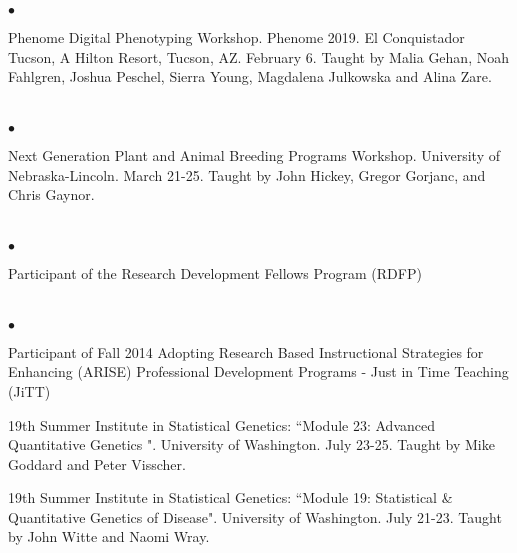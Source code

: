 \documentclass[margin,line,10pt]{res}
\newenvironment{list2}{
  \begin{list}{$\bullet$}{%
      \setlength{\itemsep}{0in}
      \setlength{\parsep}{0in} \setlength{\parskip}{0in}
      \setlength{\topsep}{0in} \setlength{\partopsep}{0in} 
      \setlength{\leftmargin}{0.2in}}}{\end{list}}
\begin{document}
\begin{resume}
\begin{list2}
  \vspace{0.5cm}
  
\item Phenome Digital Phenotyping Workshop. Phenome 2019. El Conquistador Tucson, A Hilton Resort, Tucson, AZ. February 6. Taught by Malia Gehan, Noah Fahlgren, Joshua Peschel, Sierra Young, Magdalena Julkowska and Alina Zare.
\end{list2}  


\section{}
\begin{list2}
\item Next Generation Plant and Animal Breeding Programs Workshop. University of Nebraska-Lincoln. March 21-25.  Taught by John Hickey, Gregor Gorjanc, and Chris Gaynor.
\end{list2}  


\section{}
\begin{list2}
\item Participant of the Research Development Fellows Program (RDFP) 
\end{list2}

\section{}
\begin{list2}

\item Participant of Fall 2014 Adopting Research Based Instructional Strategies for Enhancing (ARISE) Professional Development Programs - Just in Time Teaching (JiTT)

\vspace{0.5cm}

\item 19th Summer Institute in Statistical Genetics: 
``Module 23: Advanced Quantitative Genetics ". University of Washington.  July 23-25.
Taught by Mike Goddard and Peter Visscher. 

\vspace{0.5cm}

\item 19th Summer Institute in Statistical Genetics: 
``Module 19: Statistical \& Quantitative Genetics of Disease". University of Washington. July 21-23.
Taught by John Witte and Naomi Wray. 


\end{list2}
\end{resume}
\end{document}
